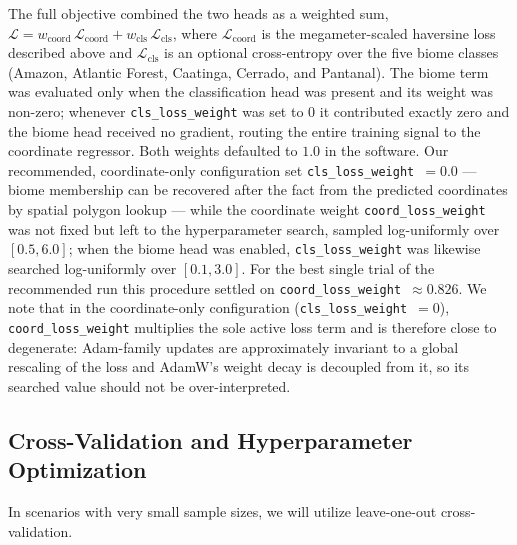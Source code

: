 \documentclass[twocolumn,10pt]{article}
\begin{document}
The full objective combined the two heads as a weighted sum, $\mathcal{L} =
w_{\text{coord}}\,\mathcal{L}_{\text{coord}} + w_{\text{cls}}\,\mathcal{L}_{\text{cls}}$, where
$\mathcal{L}_{\text{coord}}$ is the megameter-scaled haversine loss described above and
$\mathcal{L}_{\text{cls}}$ is an optional cross-entropy over the five biome classes (Amazon,
Atlantic Forest, Caatinga, Cerrado, and Pantanal). The biome term was evaluated only when the
classification head was present and its weight was non-zero; whenever \texttt{cls\_loss\_weight} was
set to $0$ it contributed exactly zero and the biome head received no gradient, routing the entire
training signal to the coordinate regressor. Both weights defaulted to $1.0$ in the software. Our
recommended, coordinate-only configuration set \texttt{cls\_loss\_weight}~$=0.0$ --- biome
membership can be recovered after the fact from the predicted coordinates by spatial polygon lookup
--- while the coordinate weight \texttt{coord\_loss\_weight} was not fixed but left to the
hyperparameter search, sampled log-uniformly over $[0.5, 6.0]$; when the biome head was enabled,
\texttt{cls\_loss\_weight} was likewise searched log-uniformly over $[0.1, 3.0]$. For the best
single trial of the recommended run this procedure settled on \texttt{coord\_loss\_weight}~$\approx
0.826$. We note that in the coordinate-only configuration (\texttt{cls\_loss\_weight}~$=0$),
\texttt{coord\_loss\_weight} multiplies the sole active loss term and is therefore close to
degenerate: Adam-family updates are approximately invariant to a global rescaling of the loss and
AdamW's weight decay is decoupled from it, so its searched value should not be over-interpreted.

\subsection{Cross-Validation and Hyperparameter Optimization}
In scenarios with very small sample sizes, we will utilize leave-one-out cross-validation.
\end{document}
